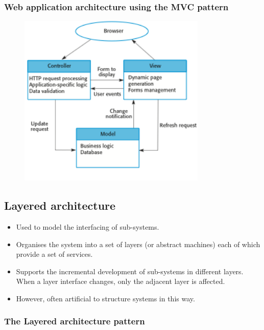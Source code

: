 \subsubsection{Web application architecture using the MVC pattern}
\begin{figure}[h!]
    \centering
    \includegraphics[width = 0.8\textwidth]{./figures/L3_3.png}
    \caption{}
    \label{fig:L3_3}
\end{figure}

\subsection{Layered architecture}
\begin{itemize}
\item Used to model the interfacing of sub-systems.

\item Organises the system into a set of layers (or abstract machines) each of which provide a set of services.

\item Supports the incremental development of sub-systems in different layers. When a layer interface changes, only the adjacent layer is affected.

\item However, often artificial to structure systems in this way.

\end{itemize}
\newpage
\subsubsection{The Layered architecture pattern}


